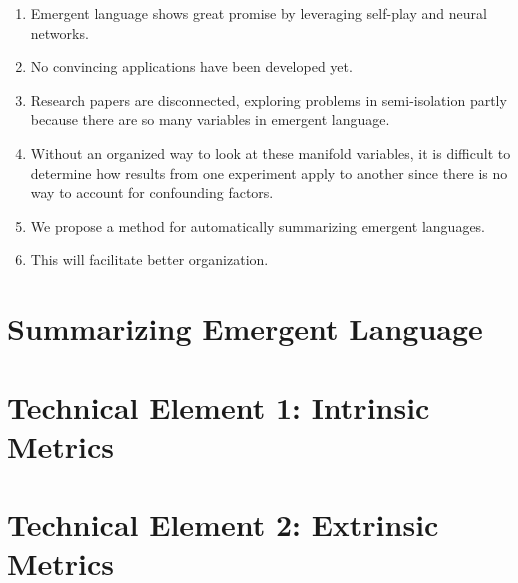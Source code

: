 \begin{enumerate}
    \item Emergent language shows great promise by leveraging self-play and neural networks.
    \item No convincing applications have been developed yet.
    \item Research papers are disconnected, exploring problems in semi-isolation partly because there are so many variables in emergent language.
    \item Without an organized way to look at these manifold variables, it is difficult to determine how results from one experiment apply to another since there is no way to account for confounding factors.
    \item We propose a method for automatically summarizing emergent languages.
    \item This will facilitate better organization.
\end{enumerate}

\section{Summarizing Emergent Language}

\section{Technical Element 1: Intrinsic Metrics}
\section{Technical Element 2: Extrinsic Metrics}
